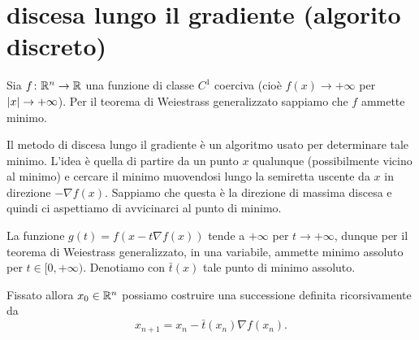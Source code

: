\section{discesa lungo il gradiente (algorito discreto)}

Sia $f\colon {\mathbb R}^n\to {\mathbb R}$ una funzione di classe $C^1$
coerciva (cioè $f(x)\to +\infty$ per ${\left|x\right|}\to +\infty$).
Per il teorema di Weiestrass generalizzato sappiamo che 
$f$ ammette minimo.

Il metodo di discesa lungo il gradiente è un algoritmo
usato per determinare tale minimo. 
L'idea è quella di partire da un punto $x$ qualunque
(possibilmente vicino al minimo) e cercare il minimo
muovendosi lungo la semiretta uscente da $x$ in direzione 
$-\nabla f(x)$. 
Sappiamo che questa è la direzione di massima discesa 
e quindi ci aspettiamo di avvicinarci al punto di minimo.

La funzione $g(t) = f(x-t\nabla f(x))$
tende a $+\infty$ per $t\to +\infty$, 
dunque per il teorema di Weiestrass generalizzato, 
in una variabile, ammette minimo assoluto 
per $t\in [0,+\infty)$. 
Denotiamo con $\bar t(x)$ tale punto di minimo assoluto.

Fissato allora $x_0\in {\mathbb R}^n$ possiamo costruire 
una successione definita ricorsivamente da
\begin{equation}\label{eq:discesa_discreta}
  x_{n+1} = x_n - \bar t(x_n) \nabla f(x_n). 
\end{equation}

